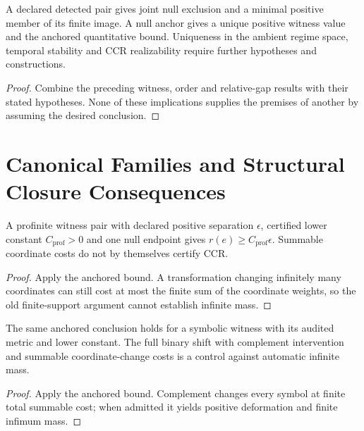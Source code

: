 \begin{theorem}\label{thm:forced-phenomenological-closure}
A declared detected pair gives joint null exclusion and a minimal positive member of its finite image. A null anchor gives a unique positive witness value and the anchored quantitative bound. Uniqueness in the ambient regime space, temporal stability and CCR realizability require further hypotheses and constructions.
\end{theorem}
\begin{proof}
Combine the preceding witness, order and relative-gap results with their stated hypotheses. None of these implications supplies the premises of another by assuming the desired conclusion.
\end{proof}

\section{Canonical Families and Structural Closure Consequences}
\begin{proposition}\label{prop:profinite-bound}
A profinite witness pair with declared positive separation $\epsilon$, certified lower constant $C_{\mathrm{prof}}>0$ and one null endpoint gives $r(e)\geq C_{\mathrm{prof}}\epsilon$. Summable coordinate costs do not by themselves certify CCR.
\end{proposition}
\begin{proof}
Apply the anchored bound. A transformation changing infinitely many coordinates can still cost at most the finite sum of the coordinate weights, so the old finite-support argument cannot establish infinite mass.
\end{proof}

\begin{proposition}\label{prop:symbolic-bound}
The same anchored conclusion holds for a symbolic witness with its audited metric and lower constant. The full binary shift with complement intervention and summable coordinate-change costs is a control against automatic infinite mass.
\end{proposition}
\begin{proof}
Apply the anchored bound. Complement changes every symbol at finite total summable cost; when admitted it yields positive deformation and finite infimum mass.
\end{proof}

